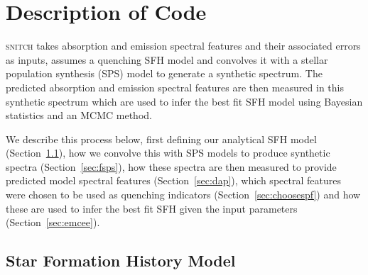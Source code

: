 \documentclass[useAMS,usenatbib]{mn2e}
\begin{document}
\section{Description of Code}\label{sec:code}

\textsc{snitch} takes absorption and emission spectral features and their associated errors as inputs, assumes a quenching SFH model and convolves it with a stellar population synthesis (SPS) model to generate a synthetic spectrum. The predicted absorption and emission spectral features are then measured in this synthetic spectrum which are used to infer the best fit SFH model using Bayesian statistics and an MCMC method. 

We describe this process below, first defining our analytical SFH model (Section~\ref{sec:sfh}), how we convolve this with SPS models to produce synthetic spectra (Section~\ref{sec:fsps}), how these spectra are then measured to provide predicted model spectral features (Section~\ref{sec:dap}), which spectral features were chosen to be used as quenching indicators (Section~\ref{sec:choosespf}) and how these are used to infer the best fit SFH given the input parameters (Section~\ref{sec:emcee}). 

\subsection{Star Formation History Model}\label{sec:sfh}
\end{document}
